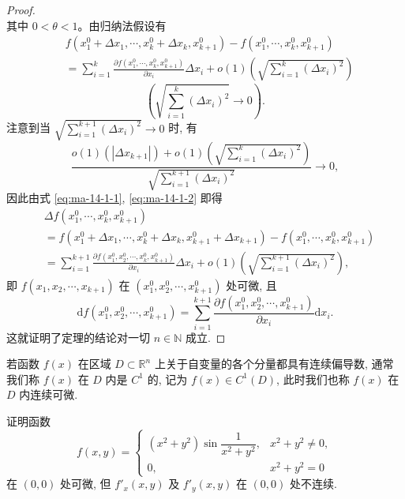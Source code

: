 \begin{proof}
\begin{equation}
\end{equation}
其中 $0<\theta<1$。由归纳法假设有
\begin{equation}
\begin{aligned}
&f(x_1^0+\Delta x_1,\cdots,x_k^0+\Delta x_k,x_{k+1}^0)
  -f(x_1^0,\cdots,x_k^0,x_{k+1}^0)\\
&=
\sum_{i=1}^k
\frac{\partial f(x_1^0,\cdots,x_k^0,x_{k+1}^0)}{\partial x_i}\Delta x_i
+o(1)\left(\sqrt{\sum_{i=1}^k(\Delta x_i)^2}\right)
\end{aligned}
\label{eq:ma-14-1-2}
\end{equation}
\[
  \left(\sqrt{\sum_{i=1}^k(\Delta x_i)^2}\to0\right).
\]
注意到当 $\sqrt{\sum\limits_{i=1}^{k+1}(\Delta x_i)^2}\to0$ 时, 有
\[
  \frac{
  o(1)(|\Delta x_{k+1}|)
  +o(1)\left(\sqrt{\sum\limits_{i=1}^k(\Delta x_i)^2}\right)}
  {\sqrt{\sum\limits_{i=1}^{k+1}(\Delta x_i)^2}}\to0,
\]
因此由式 \eqref{eq:ma-14-1-1}, \eqref{eq:ma-14-1-2} 即得
\[
\begin{aligned}
&\Delta f(x_1^0,\cdots,x_k^0,x_{k+1}^0)\\
&=
  f(x_1^0+\Delta x_1,\cdots,x_k^0+\Delta x_k,x_{k+1}^0+\Delta x_{k+1})
  -f(x_1^0,\cdots,x_k^0,x_{k+1}^0)\\
&=\sum_{i=1}^{k+1}
  \frac{\partial f(x_1^0,x_2^0,\cdots,x_k^0,x_{k+1}^0)}{\partial x_i}\Delta x_i
  +o(1)\left(\sqrt{\sum_{i=1}^{k+1}(\Delta x_i)^2}\right),
\end{aligned}
\]
即 $f(x_1,x_2,\cdots,x_{k+1})$ 在 $(x_1^0,x_2^0,\cdots,x_{k+1}^0)$ 处可微, 且
\[
  \mathrm df(x_1^0,x_2^0,\cdots,x_{k+1}^0)
  =\sum_{i=1}^{k+1}
  \frac{\partial f(x_1^0,x_2^0,\cdots,x_{k+1}^0)}{\partial x_i}\mathrm dx_i.
\]
这就证明了定理的结论对一切 $n\in\mathbb N$ 成立.
\end{proof}


\begin{remark}\label{remark:ma-14-source-16}
若函数 $f(x)$ 在区域 $D\subset\mathbb R^n$ 上关于自变量的各个分量都具有连续偏导数, 通常我们称 $f(x)$ 在 $D$ 内是 $C^1$ 的, 记为 $f(x)\in C^1(D)$, 此时我们也称 $f(x)$ 在 $D$ 内连续可微.
\end{remark}


\begin{example}\label{example:ma-14-1-5}
证明函数
\[
  f(x,y)=
  \begin{cases}
    (x^2+y^2)\sin\dfrac1{x^2+y^2}, & x^2+y^2\ne0,\\
    0, & x^2+y^2=0
  \end{cases}
\]
在 $(0,0)$ 处可微, 但 $f'_x(x,y)$ 及 $f'_y(x,y)$ 在 $(0,0)$ 处不连续.
\end{example}


